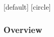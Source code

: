 \documentclass[10pt, aspectratio=169]{beamer}
\theoremstyle{remark}
\theoremstyle{definition}
\begin{document}
[default]
[circle]

\begin{frame}
	\frametitle{Overview} %
	\tableofcontents %
\end{frame}
\end{document}
